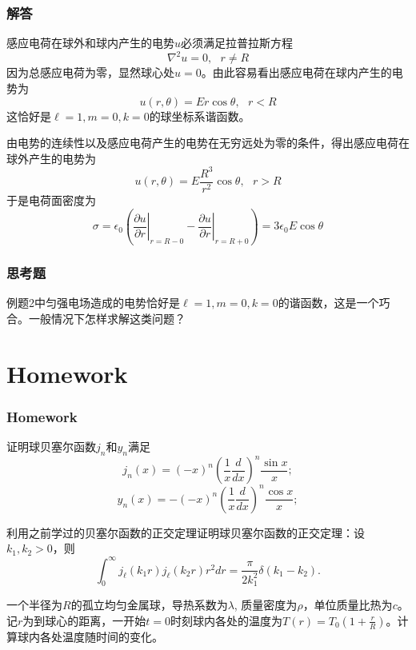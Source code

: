 \documentclass[CJK]{beamer}
\begin{document}
\begin{frame}
\frametitle{解答}


感应电荷在球外和球内产生的电势$u$必须满足拉普拉斯方程
$$\nabla^2 u = 0,\ \ \ r\ne R$$
因为总感应电荷为零，显然球心处$u=0$。由此容易看出感应电荷在球内产生的电势为
$$ u(r, \theta) = E r \cos\theta,\ \ \ r<R $$
这恰好是$\ell =1, m = 0, k=0$的球坐标系谐函数。

由电势的连续性以及感应电荷产生的电势在无穷远处为零的条件，得出感应电荷在球外产生的电势为
$$ u(r, \theta) = E \frac{R^3}{r^2}\cos\theta, \ \ \ r>R $$
于是电荷面密度为
$$\sigma =  \epsilon_0\left(\left.\frac{\partial u}{\partial r}\right\vert_{r=R-0}-\left.\frac{\partial u}{\partial r}\right\vert_{r=R+0}\right) = 3\epsilon_0E\cos\theta $$ 

\end{frame}



\begin{frame}
\frametitle{思考题}



例题2中匀强电场造成的电势恰好是$\ell = 1, m = 0, k=0$的谐函数，这是一个巧合。一般情况下怎样求解这类问题？

\end{frame}




  


\section{Homework}

\begin{frame}
\frametitle{Homework}
\bitem
\item{证明球贝塞尔函数$j_n$和$y_n$满足
  $$ j_n(x) = (-x)^n\left(\frac{1}{x}\frac{d}{dx}\right)^n\frac{\sin x}{x}; $$
  $$ y_n(x) = -(-x)^n\left(\frac{1}{x}\frac{d}{dx}\right)^n\frac{\cos x}{x}; $$}
\item{利用之前学过的贝塞尔函数的正交定理证明球贝塞尔函数的正交定理：设$k_1, k_2>0$，则
  $$\int_0^\infty j_{\ell}(k_1r)j_{\ell}(k_2r) r^2 dr = \frac{\pi}{2k_1^2} \delta(k_1-k_2).$$}
\item{一个半径为$R$的孤立均匀金属球，导热系数为$\lambda$, 质量密度为$\rho$，单位质量比热为$c$。记$r$为到球心的距离，一开始$t=0$时刻球内各处的温度为$T(r) = T_0\left(1+\frac{r}{R}\right)$。计算球内各处温度随时间的变化。}  
\eitem
\end{frame}

\ech
\end{document}
